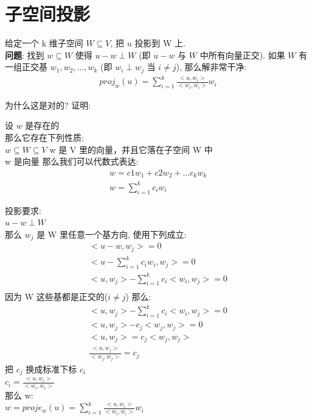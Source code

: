 \documentclass[12pt]{article}
\begin{document}
\section{子空间投影}
\begin{flushleft}
    \begin{itemize}
        给定一个 k 维子空间 $W \subseteq V$, 把 $u$ 投影到 W 上. \\
        \textbf{问题}: 找到 $w \subseteq W$ 使得 $u- w \perp W$ (即 $u - w$ 与 $W$ 中所有向量正交).
        如果 $W$ 有一组正交基 ${w_{1}, w_{2}, ... ,w_{k}}$ (即 $w_{i} \perp w_{j}$ 当 $i \neq j$), 那么解非常干净:
        \begin{align}
            proj_w(u) = \sum_{i=1}^{k}\frac{<u, w_{i}>}{<w_{i},w_{i}>}w_{i}
        \end{align}

        为什么这是对的? 证明:

        设 $w$ 是存在的 \\
        那么它存在下列性质: \\
        $w \subseteq W \subseteq V$ w 是 V 里的向量，并且它落在子空间 W 中 \\
        w 是向量 那么我们可以代数式表达: \\
        \begin{align}
            w = c{1}w_{1} + c{2}w_{2} + ... c_{k}w_{k} \\
            w = \sum_{i=1}^{k}c_{i}w_{i}
        \end{align}

        投影要求: \\
        $u - w \perp W$ \\
        那么 $w_{j}$ 是 W 里任意一个基方向, 使用下列成立: \\
        \begin{align}
            <u - w, w_{j}> = 0                                \\
            <u - \sum_{i=1}^{k}c_{i}w_{i}, w_{j}> = 0         \\
            <u, w_{j}> - \sum_{i=1}^{k}c_{i}<w_{i},w_{j}> = 0 \\
        \end{align}
        因为 W 这些基都是正交的($i \ne j $)
        那么:
        \begin{align}
            <u, w_{j}> - \sum_{i=1}^{k}c_{i}<w_{i},w_{j}> = 0 \\
            <u, w_{j}> - c_{j}<w_{j},w_{j}> = 0               \\
            <u, w_{j}>  =   c_{j}<w_{j},w_{j}>                \\
            \frac{<u, w_{j}>}{<w_{j},w_{j}>}  = c_{j}
        \end{align}
        把 $c_{j}$ 换成标准下标 $c_{i}$  \\
        $ c_{i} = \frac{<u, w_{i}>}{<w_{i},w_{i}>}$ \\
        那么 w: \\
        $w = proje_{w}(u) = \sum_{i=1}^{k}\frac{<u, w_{i}>}{<w_{i},w_{i}>}w_{i}$ \\


\end{itemize}
\end{flushleft}
\end{document}
